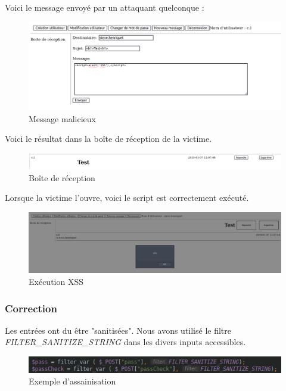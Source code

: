 \documentclass[12pt]{article}
\begin{document}
Voici le message envoyé par un attaquant quelconque : 
\begin{figure}[H]
\centering
\includegraphics[width=\linewidth]{images/xssAttack.png}
\caption{Message malicieux}
\end{figure}

Voici le résultat dans la boîte de réception de la victime.
\begin{figure}[H]
\centering
\includegraphics[width=\linewidth]{images/xssRecep.png}
\caption{Boîte de réception}
\end{figure}

Lorsque la victime l'ouvre, voici le script est correctement exécuté.
\begin{figure}[H]
\centering
\includegraphics[width=\linewidth]{images/xssOpen.png}
\caption{Exécution XSS}
\end{figure}

\subsubsection{Correction}
Les entrées ont du être "sanitisées". Nous avons utilisé le filtre \textit{FILTER\_SANITIZE\_STRING} dans les divers inputs accessibles.
\begin{figure}[H]
\centering
\includegraphics[width=\linewidth]{images/sanitize.png}
\caption{Exemple d'assainisation}
\end{figure}
\end{document}
